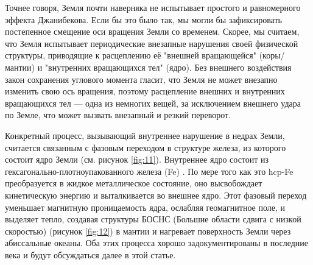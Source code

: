 \documentclass[10pt,twocolumn,letterpaper]{article}
\begin{document}
Точнее говоря, Земля почти наверняка не испытывает простого и равномерного эффекта Джанибекова. Если бы это было так, мы могли бы зафиксировать постепенное смещение оси вращения Земли со временем. Скорее, мы считаем, что Земля испытывает периодические внезапные нарушения своей физической структуры, приводящие к расцеплению её "внешней вращающейся" (коры/мантии) и "внутренних вращающихся тел" (ядро). Без внешнего воздействия закон сохранения углового момента гласит, что Земля не может внезапно изменить свою ось вращения, поэтому расцепление внешних и внутренних вращающихся тел — одна из немногих вещей, за исключением внешнего удара по Земле, что может вызвать внезапный и резкий переворот.

Конкретный процесс, вызывающий внутреннее нарушение в недрах Земли, считается связанным с фазовым переходом в структуре железа, из которого состоит ядро Земли (см. рисунок \ref{fig:11}). Внутреннее ядро состоит из гексагонально-плотноупакованного железа (Fe) \cite{141}. По мере того как это hcp-Fe преобразуется в жидкое металлическое состояние, оно высвобождает кинетическую энергию и выталкивается во внешнее ядро. Этот фазовый переход уменьшает магнитную проницаемость ядра, ослабляя геомагнитное поле, и выделяет тепло, создавая структуры БОСНС (Большие области сдвига с низкой скоростью) (рисунок \ref{fig:12}) \cite{38} в мантии и нагревает поверхность Земли через абиссальные океаны. Оба этих процесса хорошо задокументированы в последние века и будут обсуждаться далее в этой статье.
\end{document}
